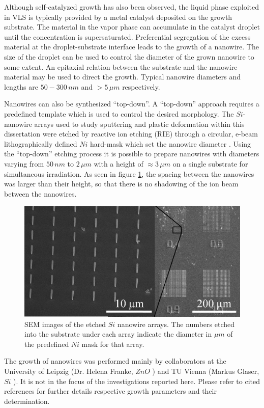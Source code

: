 
Although self-catalyzed growth has also been observed, the liquid phase exploited in VLS is typically provided by a metal catalyst deposited on the growth substrate. The material in the vapor phase can accumulate in the catalyst droplet until the concentration is supersaturated. Preferential segregation of the excess material at the droplet-substrate interface leads to the growth of a nanowire. The size of the droplet can be used to control the diameter of the grown nanowire to some extent. An epitaxial relation between the substrate and the nanowire material may be used to direct the growth. Typical nanowire diameters and lengths are $50 - 300\,nm$ and $> 5\,\mu m$ respectively.

Nanowires can also be synthesized ``top-down''. A ``top-down'' approach requires a predefined template which is used to control the desired morphology. The $Si$-nanowire arrays used to study sputtering and plastic deformation within this dissertation were etched by reactive ion etching (RIE) through a circular, e-beam lithographically defined $Ni$ hard-mask which set the nanowire diameter \cite{johannes_anomalous_2015}. Using the ``top-down'' etching process it is possible to prepare nanowires with diameters varying from $50\,nm$ to $2\,\mu m$ with a height of $\approx 3\,\mu m$ on a single substrate for simultaneous irradiation. As seen in figure \ref{SEMarray}, the spacing between the nanowires was larger than their height, so that there is no shadowing of the ion beam between the nanowires.

\begin{figure}
	\centering
		\includegraphics[width=.5\textwidth]{images/SEMarray.jpg}
	\caption{SEM images of the etched $Si$ nanowire arrays. The numbers etched into the substrate under each array indicate the diameter in $\mu m$ of the predefined $Ni$ mask for that array.}
	\label{SEMarray}
\end{figure} 

The growth of nanowires was performed mainly by collaborators at the University of Leipzig (Dr. Helena Franke, $ZnO$ \cite{cao_tuning_2010}) and TU Vienna (Markus Glaser, $Si$ \cite{lugstein_pressure-induced_2008,johannes_anomalous_2015}). It is not in the focus of the investigations reported here. Please refer to cited references for further details respective growth parameters and their determination.

